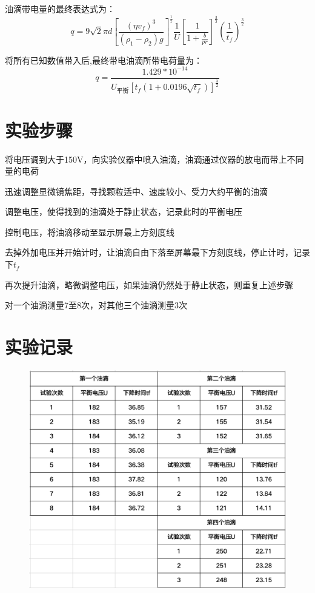 \documentclass[UTF8]{ctexart}
\begin{document}
    油滴带电量的最终表达式为：
    \begin{equation}
        q=9\sqrt{2}\pi d[\frac{(\eta v_f)^{3}}{(\rho _1-\rho _2)g}]^{\frac{1}{2}}\frac{1}{U}[\frac{1}{1+\frac{b}{pr}}]^{\frac32}(\frac{1}{t_f})^{\frac32}
    \end{equation}
    
    将所有已知数值带入后,最终带电油滴所带电荷量为：
    \begin{equation}
        q=\frac{1.429*10^{-14}}{U_{平衡}[t_f(1+0.0196\sqrt{t_f})]^{\frac{3}{2}}}
    \end{equation}
    \section{实验步骤}
    将电压调到大于150V，向实验仪器中喷入油滴，油滴通过仪器的放电而带上不同量的电荷

    迅速调整显微镜焦距，寻找颗粒适中、速度较小、受力大约平衡的油滴

    调整电压，使得找到的油滴处于静止状态，记录此时的平衡电压

    控制电压，将油滴移动至显示屏最上方刻度线
    
    去掉外加电压并开始计时，让油滴自由下落至屏幕最下方刻度线，停止计时，记录下$t_f$

    再次提升油滴，略微调整电压，如果油滴仍然处于静止状态，则重复上述步骤

    对一个油滴测量7至8次，对其他三个油滴测量3次

    \section{实验记录}

    \begin{figure}[ht]
        \centering 
        \includegraphics[width=12cm]{q.png}
    \end{figure}
\end{document}
